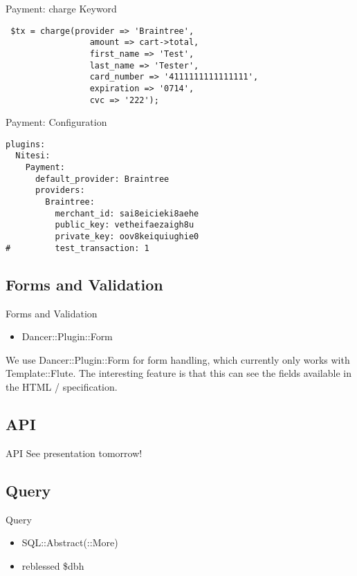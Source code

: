 \begin{frame}[fragile]{Payment: charge Keyword}
\begin{lstlisting}
 $tx = charge(provider => 'Braintree',
                 amount => cart->total,
                 first_name => 'Test',
                 last_name => 'Tester',
                 card_number => '4111111111111111',
                 expiration => '0714',
                 cvc => '222');
\end{lstlisting}
\end{frame}

\begin{frame}[fragile]{Payment: Configuration}
\begin{lstlisting}
plugins:
  Nitesi:
    Payment:
      default_provider: Braintree
      providers:
        Braintree:
          merchant_id: sai8eicieki8aehe 
          public_key: vetheifaezaigh8u 
          private_key: oov8keiquiughie0
#         test_transaction: 1
\end{lstlisting}
\end{frame}

\subsection{Forms and Validation}
\begin{frame}{Forms and Validation}
\begin{itemize}
\item Dancer::Plugin::Form
\end{itemize}
\end{frame}

We use Dancer::Plugin::Form for form handling, which currently
only works with Template::Flute. The interesting feature is
that this can see the fields available in the HTML / specification.

\subsection{API}
\begin{frame}{API}
See presentation tomorrow!
\end{frame}

\subsection{Query}
\begin{frame}{Query}
\begin{itemize}
\item SQL::Abstract(::More)
\item reblessed \$dbh
\end{itemize}
\end{frame}


